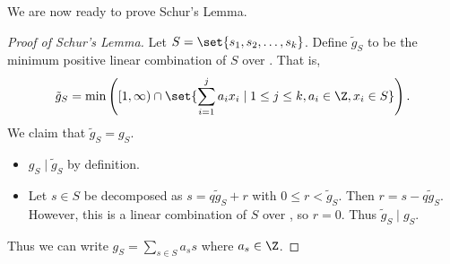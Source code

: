 We are now ready to prove Schur's Lemma.
\begin{proof}[Proof of Schur's Lemma]
    Let $S = \set{s_1, s_2, \dots, s_k}$.
    Define $\tilde{g}_S$ to be the minimum positive linear combination of
    $S$ over \Z.
    That is, \[
        \tilde{g}_S = \min\left([1, \infty) \cap
            \set{\sum_{i=1}^{j} a_i x_i \mid 1 \le j \le k,
            a_i \in \Z, x_i \in S}\right).
    \] We claim that $\tilde{g}_S = g_S$.
    \begin{itemize}
        \item $g_S \mid \tilde{g}_S$ by definition.
        \item Let $s \in S$ be decomposed as $s = q \tilde{g}_S + r$ with
        $0 \le r < \tilde{g}_S$.
        Then $r = s - q \tilde{g}_S$.
        However, this is a linear combination of $S$ over \Z, so
        $r = 0$.
        Thus $\tilde{g}_S \mid g_S$.
    \end{itemize}
    Thus we can write $g_S = \sum_{s \in S} a_s s$ where $a_s \in \Z$.
    \renewcommand{\qedsymbol}{$\dots$}
\end{proof}
